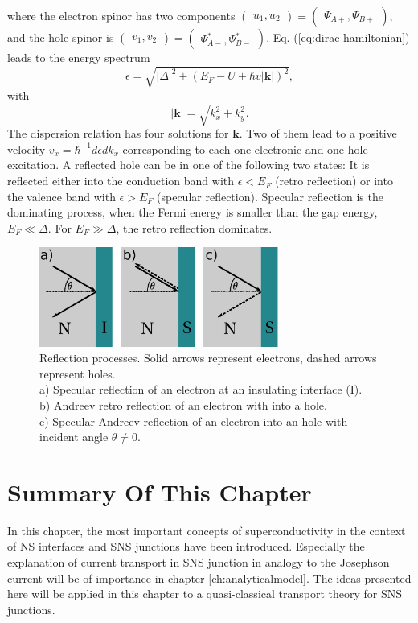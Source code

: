 where the electron spinor has two components $\begin{pmatrix} u_1, u_2\end{pmatrix} = \begin{pmatrix} \Psi_{A+}, \Psi_{B+} \end{pmatrix}$, and the hole spinor is $\begin{pmatrix} v_1, v_2\end{pmatrix} = \begin{pmatrix} \Psi^{*}_{A-},  \Psi^{*}_{B-} \end{pmatrix}$.
Eq. (\ref{eq:dirac-hamiltonian}) leads to the energy spectrum
\begin{equation}
\epsilon = \sqrt{|\Delta|^2 + \left( E_F - U \pm \hbar v |\mathbf{k}|\right) ^2},  
\end{equation}
with
\begin{equation}
|\mathbf{k}| = \sqrt{k_x^2 + k_y^2}.
\end{equation}
The dispersion relation has four solutions for $\mathbf{k}$. Two of them lead to a positive velocity $v_x = \hbar^{-1} d \epsilon d k_x$ corresponding to each one electronic and one hole excitation. A reflected hole can be in one of the following two states: It is reflected either into the conduction band with $\epsilon < E_F$ (retro reflection) or into the valence band with $\epsilon > E_F$ (specular reflection). Specular reflection is the dominating process, when the Fermi energy is smaller than the gap energy, $E_F \ll \Delta$. For $E_F \gg \Delta$, the retro reflection dominates. 
\begin{figure}
\centering
\includegraphics[width=0.7\textwidth]{figure/framework-analytical/specular-reflection_csch}
\caption{Reflection processes. Solid arrows represent electrons, dashed arrows represent holes. \\ a) Specular reflection of an electron at an insulating interface (I). \\ b) Andreev retro reflection of an electron with into a hole. \\ c) Specular Andreev reflection of an electron into an hole with incident angle $\theta \neq 0$.}\label{fig:specular-sns}
\end{figure}
\section{Summary Of This Chapter}
In this chapter, the most important concepts of superconductivity in the context of NS interfaces and SNS junctions have been introduced. Especially the explanation of current transport in SNS junction in analogy to the Josephson current will be of importance in chapter \ref{ch:analyticalmodel}. The ideas presented here will be applied in this chapter to a quasi-classical transport theory for SNS junctions.

 
